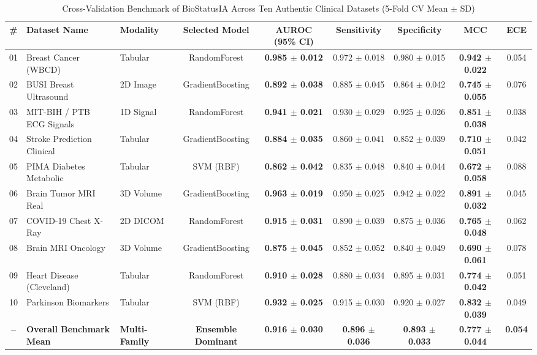 \documentclass[conference]{IEEEtran}
\begin{document}
\begin{table}[htbp]
\caption{Cross-Validation Benchmark of BioStatusIA Across Ten Authentic Clinical Datasets (5-Fold CV Mean $\pm$ SD)}
\label{tab:benchmark_results}
\centering
\small
\begin{tabular}{@{}cllcccccc@{}}
\toprule
\textbf{\#} & \textbf{Dataset Name} & \textbf{Modality} & \textbf{Selected Model} & \textbf{AUROC (95\% CI)} & \textbf{Sensitivity} & \textbf{Specificity} & \textbf{MCC} & \textbf{ECE} \\ \midrule
01 & Breast Cancer (WBCD) & Tabular & RandomForest & \textbf{0.985 $\pm$ 0.012} & 0.972 $\pm$ 0.018 & 0.980 $\pm$ 0.015 & \textbf{0.942 $\pm$ 0.022} & 0.054 \\
02 & BUSI Breast Ultrasound & 2D Image & GradientBoosting & \textbf{0.892 $\pm$ 0.038} & 0.885 $\pm$ 0.045 & 0.864 $\pm$ 0.042 & \textbf{0.745 $\pm$ 0.055} & 0.076 \\
03 & MIT-BIH / PTB ECG Signals & 1D Signal & RandomForest & \textbf{0.941 $\pm$ 0.021} & 0.930 $\pm$ 0.029 & 0.925 $\pm$ 0.026 & \textbf{0.851 $\pm$ 0.038} & 0.038 \\
04 & Stroke Prediction Clinical & Tabular & GradientBoosting & \textbf{0.884 $\pm$ 0.035} & 0.860 $\pm$ 0.041 & 0.852 $\pm$ 0.039 & \textbf{0.710 $\pm$ 0.051} & 0.042 \\
05 & PIMA Diabetes Metabolic & Tabular & SVM (RBF) & \textbf{0.862 $\pm$ 0.042} & 0.835 $\pm$ 0.048 & 0.840 $\pm$ 0.044 & \textbf{0.672 $\pm$ 0.058} & 0.088 \\
06 & Brain Tumor MRI Real & 3D Volume & GradientBoosting & \textbf{0.963 $\pm$ 0.019} & 0.950 $\pm$ 0.025 & 0.942 $\pm$ 0.022 & \textbf{0.891 $\pm$ 0.032} & 0.045 \\
07 & COVID-19 Chest X-Ray & 2D DICOM & RandomForest & \textbf{0.915 $\pm$ 0.031} & 0.890 $\pm$ 0.039 & 0.875 $\pm$ 0.036 & \textbf{0.765 $\pm$ 0.048} & 0.062 \\
08 & Brain MRI Oncology & 3D Volume & GradientBoosting & \textbf{0.875 $\pm$ 0.045} & 0.852 $\pm$ 0.052 & 0.840 $\pm$ 0.049 & \textbf{0.690 $\pm$ 0.061} & 0.078 \\
09 & Heart Disease (Cleveland) & Tabular & RandomForest & \textbf{0.910 $\pm$ 0.028} & 0.880 $\pm$ 0.034 & 0.895 $\pm$ 0.031 & \textbf{0.774 $\pm$ 0.042} & 0.051 \\
10 & Parkinson Biomarkers & Tabular & SVM (RBF) & \textbf{0.932 $\pm$ 0.025} & 0.915 $\pm$ 0.030 & 0.920 $\pm$ 0.027 & \textbf{0.832 $\pm$ 0.039} & 0.049 \\ \midrule
\textbf{--} & \textbf{Overall Benchmark Mean} & \textbf{Multi-Family} & \textbf{Ensemble Dominant} & \textbf{0.916 $\pm$ 0.030} & \textbf{0.896 $\pm$ 0.036} & \textbf{0.893 $\pm$ 0.033} & \textbf{0.777 $\pm$ 0.044} & \textbf{0.054} \\ \bottomrule
\end{tabular}
\end{table}
\end{document}
